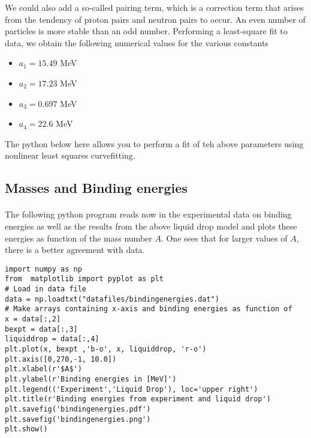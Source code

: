 \documentclass[%
twoside,                 %
final,                   %
10pt]{article}
\begin{document}
\noindent
We could also add a so-called pairing term, which is a correction term that
arises from the tendency of proton pairs and neutron pairs to
occur. An even number of particles is more stable than an odd number. 
Performing a least-square fit to data, we obtain the following numerical values for the various constants
\begin{itemize}
\item $a_1=15.49$ MeV

\item $a_2=17.23$ MeV

\item $a_3=0.697$ MeV

\item $a_4=22.6$ MeV
\end{itemize}

\noindent
The python below here allows you to perform a fit of teh above parameters using nonlinear least squares curvefitting.



\subsection*{Masses and Binding energies}

\paragraph{}
The following python program reads now in the experimental data on binding energies as well as the results from the above liquid drop model and plots these energies as function of the mass number $A$. One sees that for larger values of $A$, there is a better agreement with data. 
\begin{verbatim}
import numpy as np
from  matplotlib import pyplot as plt
# Load in data file
data = np.loadtxt("datafiles/bindingenergies.dat")
# Make arrays containing x-axis and binding energies as function of
x = data[:,2]
bexpt = data[:,3]
liquiddrop = data[:,4]
plt.plot(x, bexpt ,'b-o', x, liquiddrop, 'r-o')
plt.axis([0,270,-1, 10.0])
plt.xlabel(r'$A$')
plt.ylabel(r'Binding energies in [MeV]')
plt.legend(('Experiment','Liquid Drop'), loc='upper right')
plt.title(r'Binding energies from experiment and liquid drop')
plt.savefig('bindingenergies.pdf')
plt.savefig('bindingenergies.png')
plt.show()
\end{verbatim}
\end{document}
